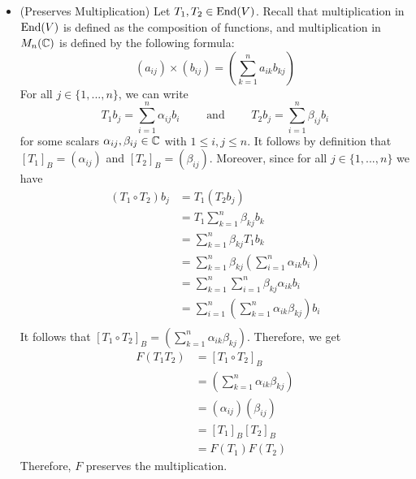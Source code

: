 \begin{solution}
\begin{itemize}
        \item (Preserves Multiplication) Let $T_1, T_2 \in \text{End}(V)$. Recall that multiplication in $\text{End}(V)$ is defined as the composition of functions, and multiplication in $M_{n}(\mathbb{C})$ is defined by the following formula:
        $$(a_{ij}) \times (b_{ij}) = \left(\sum_{k=1}^{n}a_{ik} b_{kj}\right)$$
        For all $j \in \{1, ..., n\}$, we can write
        $$T_1b_j = \sum_{i=1}^{n}\alpha_{ij}b_i \qquad \text{ and } \qquad T_2b_j = \sum_{i=1}^{n}\beta_{ij}b_i$$
        for some scalars $\alpha_{ij}, \beta_{ij} \in \mathbb{C}$ with $1\leq i,j \leq n$. It follows by definition that $[T_1]_B = (\alpha_{ij})$ and $[T_2]_B = (\beta_{ij})$. Moreover, since for all $j \in \{1, ..., n\}$ we have
        \begin{align*}
            (T_1 \circ T_2)b_j &= T_1(T_2b_j) \\
            &= T_1\sum_{k=1}^{n}\beta_{kj}b_k \\
            &= \sum_{k=1}^{n}\beta_{kj}T_1b_k \\
            &= \sum_{k=1}^{n}\beta_{kj}\left(\sum_{i=1}^{n}\alpha_{ik}b_i\right) \\
            &= \sum_{k=1}^{n}\sum_{i=1}^{n}\beta_{kj}\alpha_{ik}b_i \\
            &= \sum_{i=1}^{n} \left(\sum_{k=1}^{n}\alpha_{ik}\beta_{kj} \right)b_i \\
        \end{align*}
        It follows that $[T_1 \circ T_2]_B = (\sum_{k=1}^{n}\alpha_{ik}\beta_{kj})$. Therefore, we get
        \begin{align*}
            F(T_1 T_2) &= [T_1 \circ T_2]_B \\
            &= \left(\sum_{k=1}^{n}\alpha_{ik}\beta_{kj} \right) \\
            &= (\alpha_{ij})  (\beta_{ij}) \\
            &= [T_1]_B [T_2]_B \\
            &= F(T_1)F(T_2)
        \end{align*}
        Therefore, $F$ preserves the multiplication.


\end{itemize}
\end{solution}
